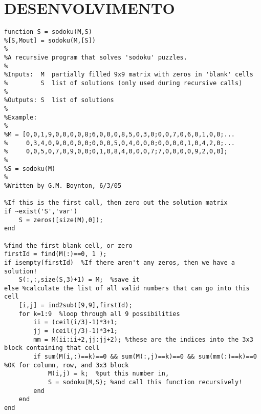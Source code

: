 \documentclass[
	12pt,				%
	openright,			%
	oneside,			%
	a4paper,			%
	chapter=TITLE,		%
	english,			%
	french,				%
	spanish,			%
	brazil,				%
	article,			%
	]{uea-abntex2}
\begin{document}
\section{DESENVOLVIMENTO}
\hspace*{0.8cm}
\begin{lstlisting}
function S = sodoku(M,S)
%[S,Mout] = sodoku(M,[S])
%
%A recursive program that solves 'sodoku' puzzles.
%
%Inputs:  M  partially filled 9x9 matrix with zeros in 'blank' cells
%         S  list of solutions (only used during recursive calls)
%
%Outputs: S  list of solutions
%
%Example:
%
%M = [0,0,1,9,0,0,0,0,8;6,0,0,0,8,5,0,3,0;0,0,7,0,6,0,1,0,0;...
%     0,3,4,0,9,0,0,0,0;0,0,0,5,0,4,0,0,0;0,0,0,0,1,0,4,2,0;...
%     0,0,5,0,7,0,9,0,0;0,1,0,8,4,0,0,0,7;7,0,0,0,0,9,2,0,0];
%
%S = sodoku(M)
%
%Written by G.M. Boynton, 6/3/05

%If this is the first call, then zero out the solution matrix
if ~exist('S','var')
    S = zeros([size(M),0]);
end

%find the first blank cell, or zero
firstId = find(M(:)==0, 1 );
if isempty(firstId)  %If there aren't any zeros, then we have a solution!
    S(:,:,size(S,3)+1) = M;  %save it
else %calculate the list of all valid numbers that can go into this cell
    [i,j] = ind2sub([9,9],firstId);
    for k=1:9  %loop through all 9 possibilities
        ii = (ceil(i/3)-1)*3+1;
        jj = (ceil(j/3)-1)*3+1;
        mm = M(ii:ii+2,jj:jj+2); %these are the indices into the 3x3 block containing that cell
        if sum(M(i,:)==k)==0 && sum(M(:,j)==k)==0 && sum(mm(:)==k)==0  %OK for column, row, and 3x3 block
            M(i,j) = k;  %put this number in,
            S = sodoku(M,S); %and call this function recursively!
        end
    end
end
\end{lstlisting}

\newpage
\vspace*{2.3cm}
\renewcommand{\bibname}{REFERÊNCIAS}

\end{document}
